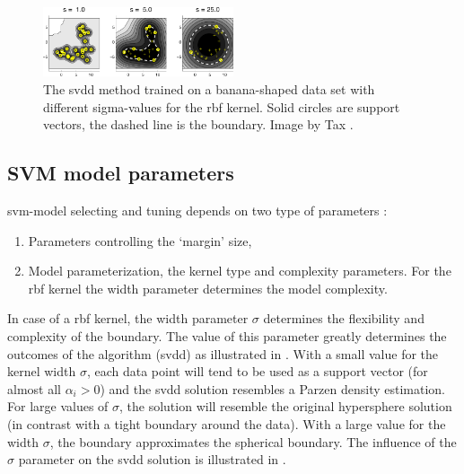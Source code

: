 \begin{figure}
  \centering
    \includegraphics[width=0.5\textwidth,keepaspectratio]{./Figures/chapter3/svdd-boundary.pdf}
  \caption[\gls{svdd} boundary]{The \gls{svdd} method trained on a banana-shaped data set with different sigma-values for the \gls{rbf} kernel. Solid circles are support vectors, the dashed line is the boundary. Image by Tax \cite{tax2001one}.}
  \label{fig:svdd-boundary}
\end{figure}


\subsection{SVM model parameters}\label{subsec:svm_model_parameters}
\gls{svm}-model selecting and tuning depends on two type of parameters \cite{cherkassky2007learning}:
\begin{enumerate}
  \item Parameters controlling the `margin' size,
  \item Model parameterization, \eg the kernel type and complexity parameters.
  For the \gls{rbf} kernel the width parameter determines the model complexity.
\end{enumerate}

In case of a \gls{rbf} kernel, the width parameter $\sigma$ determines the flexibility and complexity of the boundary.
The value of this parameter greatly determines the outcomes of the algorithm (\eg \gls{svdd}) as illustrated in .
With a small value for the kernel width $\sigma$, each data point will tend to be used as a support vector (for almost all $\alpha_i > 0$) and the \gls{svdd} solution resembles a Parzen density estimation.
For large values of $\sigma$, the solution will resemble the original hypersphere solution (in contrast with a tight boundary around the data).
With a large value for the width $\sigma$, the boundary approximates the spherical boundary.
The influence of the $\sigma$ parameter on the \gls{svdd} solution is illustrated in .

